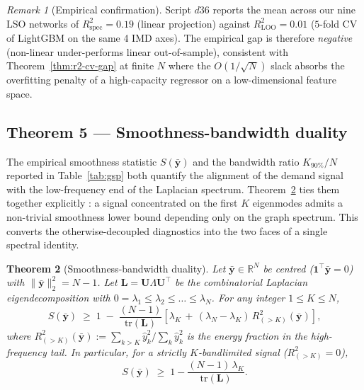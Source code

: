 \documentclass[11pt,a4paper]{article}
\newcommand{\tr}{\mathrm{tr}}
\newcommand{\1}{\mathbb{1}}
\newcommand{\bU}{\mathbf{U}}
\newcommand{\bone}{\mathbf{1}}
\newcommand{\by}{\bar{\mathbf{y}}}
\newcommand{\Lcomb}{\mathbf{L}}
\theoremstyle{plain}
\newtheorem{theorem}{Theorem}
\theoremstyle{definition}
\theoremstyle{remark}
\newtheorem{remark}[theorem]{Remark}
\begin{document}
\begin{remark}[Empirical confirmation]
\label{rem:d36}
Script $d36$ reports the mean across our nine LSO networks of
$R^2_{\mathrm{spec}} = 0.19$ (linear projection) against
$R^2_{\mathrm{LOO}} = 0.01$ ($5$-fold CV of LightGBM on the same
4 IMD axes).  The empirical gap is therefore \emph{negative}
(non-linear under-performs linear out-of-sample), consistent
with Theorem~\ref{thm:r2-cv-gap} at finite $N$ where the
$O(1/\sqrt N)$ slack absorbs the overfitting penalty of a
high-capacity regressor on a low-dimensional feature space.
\end{remark}

\subsection{Theorem 5 --- Smoothness-bandwidth duality}

The empirical smoothness statistic $S(\by)$ and the bandwidth
ratio $K_{90\%}/N$ reported in Table~\ref{tab:gsp} both quantify
the alignment of the demand signal with the low-frequency end of
the Laplacian spectrum.  Theorem~\ref{thm:smoothness-bandwidth}
ties them together explicitly : a signal concentrated on the
first $K$ eigenmodes admits a non-trivial smoothness lower bound
depending only on the graph spectrum.  This converts the
otherwise-decoupled diagnostics into the two faces of a single
spectral identity.

\begin{theorem}[Smoothness-bandwidth duality]
\label{thm:smoothness-bandwidth}
Let $\by \in \mathbb{R}^N$ be centred ($\bone^\top \by = 0$) with
$\| \by \|_2^2 = N - 1$.  Let $\Lcomb = \bU \Lambda \bU^\top$ be
the combinatorial Laplacian eigendecomposition with
$0 = \lambda_1 \leq \lambda_2 \leq \ldots \leq \lambda_N$.
For any integer $1 \leq K \leq N$,
\begin{equation}
    S(\by) \;\geq\; 1 \;-\; \frac{(N-1)}{\tr(\Lcomb)}
    \!\left[ \lambda_K \,+\, (\lambda_N - \lambda_K)\,
              R^2_{(>K)}(\by) \right],
    \label{eq:smooth-band}
\end{equation}
where $R^2_{(>K)}(\by) := \sum_{k > K} \hat y_k^2 / \sum_k \hat y_k^2$
is the energy fraction in the high-frequency tail.  In particular,
for a strictly $K$-bandlimited signal ($R^2_{(>K)} = 0$),
\begin{equation}
    S(\by) \;\geq\; 1 - \frac{(N-1)\, \lambda_K}{\tr(\Lcomb)}.
    \label{eq:smooth-band-limited}
\end{equation}
\end{theorem}
\end{document}
